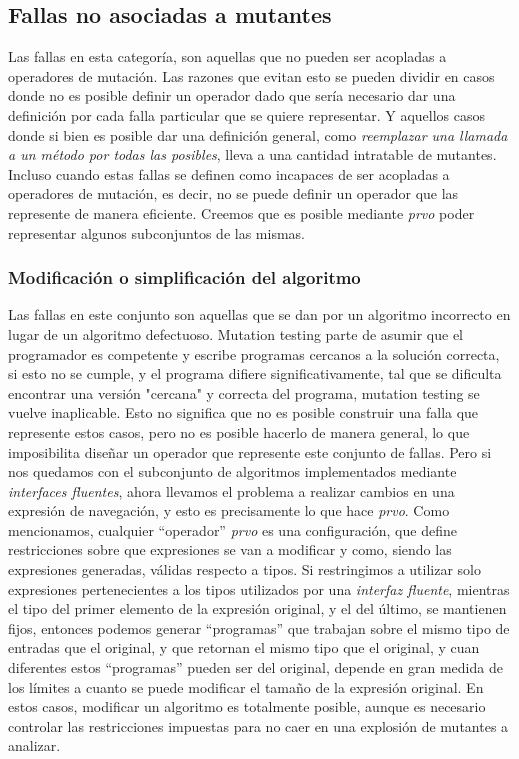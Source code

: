 \subsection{Fallas no asociadas a mutantes}

Las fallas en esta categor\'ia, son aquellas que no pueden ser acopladas a operadores de mutaci\'on. Las razones que evitan esto se pueden dividir en casos donde no es posible definir un operador dado que ser\'ia necesario dar una definici\'on por cada falla particular que se quiere representar. Y aquellos casos donde si bien es posible dar una definici\'on general, como \emph{reemplazar una llamada a un m\'etodo por todas las posibles}, lleva a una cantidad intratable de mutantes. Incluso cuando estas fallas se definen como incapaces de ser acopladas a operadores de mutaci\'on, es decir, no se puede definir un operador que las represente de manera eficiente. Creemos que es posible mediante \emph{prvo} poder representar algunos subconjuntos de las mismas.

\subsubsection{Modificaci\'on o simplificaci\'on del algoritmo}

Las fallas en este conjunto son aquellas que se dan por un algoritmo incorrecto en lugar de un algoritmo defectuoso. Mutation testing parte de asumir que el programador es competente y escribe programas cercanos a la soluci\'on correcta, si esto no se cumple, y el programa difiere significativamente, tal que se dificulta encontrar una versi\'on "cercana" y correcta del programa, mutation testing se vuelve inaplicable. Esto no significa que no es posible construir una falla que represente estos casos, pero no es posible hacerlo de manera general, lo que imposibilita dise\~nar un operador que represente este conjunto de fallas. Pero si nos quedamos con el subconjunto de algoritmos implementados mediante \emph{interfaces fluentes}, ahora llevamos el problema a realizar cambios en una expresi\'on de navegaci\'on, y esto es precisamente lo que hace \emph{prvo}. Como mencionamos, cualquier ``operador'' \emph{prvo} es una configuraci\'on, que define restricciones sobre que expresiones se van a modificar y como, siendo las expresiones generadas, v\'alidas respecto a tipos. Si restringimos a utilizar solo expresiones pertenecientes a los tipos utilizados por una \emph{interfaz fluente}, mientras el tipo del primer elemento de la expresi\'on original, y el del \'ultimo, se mantienen fijos, entonces podemos generar ``programas'' que trabajan sobre el mismo tipo de entradas que el original, y que retornan el mismo tipo que el original, y cuan diferentes estos ``programas'' pueden ser del original, depende en gran medida de los l\'imites a cuanto se puede modificar el tama\~no de la expresi\'on original. En estos casos, modificar un algoritmo es totalmente posible, aunque es necesario controlar las restricciones impuestas para no caer en una explosi\'on de mutantes a analizar.

